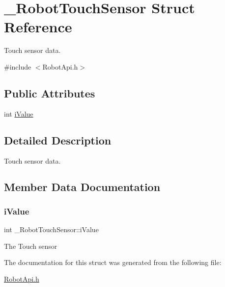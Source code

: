 \hypertarget{struct__RobotTouchSensor}{}\section{\+\_\+\+Robot\+Touch\+Sensor Struct Reference}
\label{struct__RobotTouchSensor}


Touch sensor data.  




{\ttfamily \#include $<$Robot\+Api.\+h$>$}

\subsection*{Public Attributes}
\begin{DoxyCompactItemize}
\item 
int \hyperlink{struct__RobotTouchSensor_add5e6cd8bce6fb09abbfd6c3f09a3faa}{i\+Value}
\end{DoxyCompactItemize}


\subsection{Detailed Description}
Touch sensor data. 

\subsection{Member Data Documentation}
\mbox{\label{struct__RobotTouchSensor_add5e6cd8bce6fb09abbfd6c3f09a3faa}} 
\subsubsection{\texorpdfstring{i\+Value}{iValue}}
{\footnotesize\ttfamily int \+\_\+\+Robot\+Touch\+Sensor\+::i\+Value}

The Touch sensor 

The documentation for this struct was generated from the following file\+:\begin{DoxyCompactItemize}
\item 
\hyperlink{RobotApi_8h}{Robot\+Api.\+h}\end{DoxyCompactItemize}
